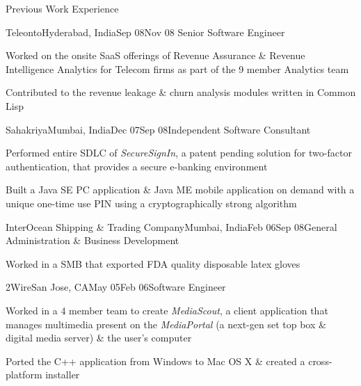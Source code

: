\documentclass{resume} %
\begin{document}
\begin{rSection}{Previous Work Experience}

\begin{rSubsection}{Teleonto}{Hyderabad, India}{Sep 08}{Nov 08}
{Senior Software Engineer}
\item Worked on the onsite SaaS offerings of Revenue Assurance \& Revenue Intelligence Analytics for Telecom firms as part of the 9 member Analytics team
\item Contributed to the revenue leakage \& churn analysis modules written in Common Lisp
\end{rSubsection}


\begin{rSubsection}{Sahakriya}{Mumbai, India}{Dec 07}{Sep 08}{Independent Software Consultant}
\item Performed entire SDLC of {\em SecureSignIn}, a patent pending solution for two-factor authentication, that provides a secure e-banking environment
\item Built a Java SE PC application \& Java ME mobile application on demand with a unique one-time use PIN using a cryptographically strong algorithm
\end{rSubsection}


\begin{rSubsection}{InterOcean Shipping \& Trading Company}{Mumbai,
    India}{Feb 06}{Sep 08}{General Administration \& Business Development}
\item Worked in a SMB that exported FDA quality disposable latex gloves
\end{rSubsection}


\begin{rSubsection}{2Wire}{San Jose, CA}{May 05}{Feb 06}{Software Engineer}
\item Worked in a 4 member team to create {\em MediaScout}, a client
  application that manages multimedia present on the {\em MediaPortal}
  (a next-gen set top box \& digital media server) \& the user's computer
\item Ported the C++ application from Windows to Mac OS X \& created a cross-platform installer
\end{rSubsection}

\end{rSection}
\end{document}
